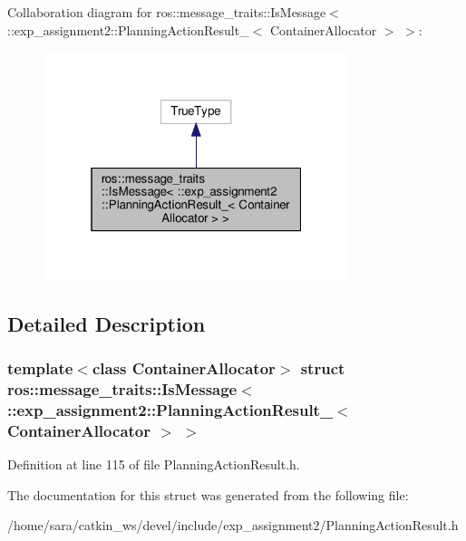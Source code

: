 Collaboration diagram for ros\+:\+:message\+\_\+traits\+:\+:Is\+Message$<$ \+:\+:exp\+\_\+assignment2\+:\+:Planning\+Action\+Result\+\_\+$<$ Container\+Allocator $>$ $>$\+:
\nopagebreak
\begin{figure}[H]
\begin{center}
\leavevmode
\includegraphics[width=253pt]{structros_1_1message__traits_1_1IsMessage_3_01_1_1exp__assignment2_1_1PlanningActionResult___3_0b88c9f0c7f0792c03f55412e9b0907f3}
\end{center}
\end{figure}


\subsection{Detailed Description}
\subsubsection*{template$<$class Container\+Allocator$>$\newline
struct ros\+::message\+\_\+traits\+::\+Is\+Message$<$ \+::exp\+\_\+assignment2\+::\+Planning\+Action\+Result\+\_\+$<$ Container\+Allocator $>$ $>$}



Definition at line 115 of file Planning\+Action\+Result.\+h.



The documentation for this struct was generated from the following file\+:\begin{DoxyCompactItemize}
\item 
/home/sara/catkin\+\_\+ws/devel/include/exp\+\_\+assignment2/Planning\+Action\+Result.\+h\end{DoxyCompactItemize}
